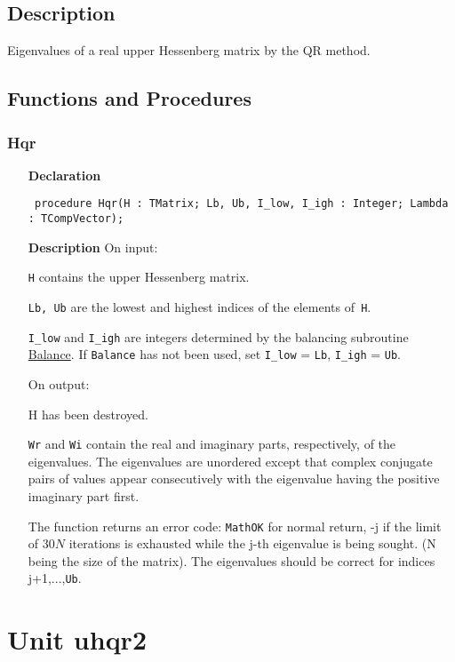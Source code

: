 \documentclass[12pt,a4paper,oneside]{report}
\newcommand{\declarationitem}[1]{\textbf{#1}}
\newcommand{\descriptiontitle}[1]{\textbf{#1}}
\newcommand{\code}[1]{\texttt{#1}}
\begin{document}
\subsection{Description}
Eigenvalues of a real upper Hessenberg matrix by the QR method.
\subsection{Functions and Procedures}
\subsubsection{Hqr}
\label{uhqr-Hqr}
\begin{itemize}\item[\declarationitem{Declaration}\hfill]
	\begin{flushleft}
		\code{
			procedure Hqr(H : TMatrix; Lb, Ub, I{\_}low, I{\_}igh : Integer; Lambda : TCompVector);}
		
	\end{flushleft}
	
	\par
	\item[\descriptiontitle{Description}]
	On input:
	
	\code{H} contains the upper Hessenberg matrix.
	
	\code{Lb, Ub} are the lowest and highest indices of the elements of\code{ H}.
	
	\code{I{\_}low} and \code{I{\_}igh} are integers determined by the balancing subroutine \hyperref[ubalance]{Balance}. If \code{Balance} has not been used, set \code{I{\_}low} = \code{Lb}, \code{I{\_}igh} = \code{Ub}.
	
	On output:
	
	H has been destroyed.
	
	\code{Wr} and \code{Wi} contain the real and imaginary parts, respectively, of the eigenvalues. The eigenvalues are unordered except that complex conjugate pairs of values appear consecutively with the eigenvalue having the positive imaginary part first.
	
	The function returns an error code: \code{MathOK} for normal return, {-}j if the limit of $30N$ iterations is exhausted while the j{-}th eigenvalue is being sought. (N being the size of the matrix). The eigenvalues should be correct for indices j+1,...,\code{Ub}.
	
\end{itemize}
\section{Unit uhqr2}
\label{uhqr2}
\end{document}
